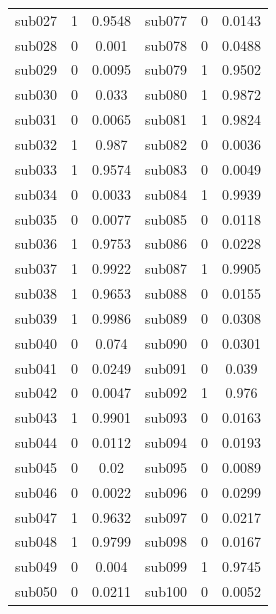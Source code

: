 \documentclass[bwprint]{gmcmthesis}
\begin{document}
\begin{table}[htbp]
\begin{tabular}{cccccc}
    sub027 & 1 & 0.9548 & sub077 & 0 & 0.0143 \\
    sub028 & 0 & 0.001 & sub078 & 0 & 0.0488 \\
    sub029 & 0 & 0.0095 & sub079 & 1 & 0.9502 \\
    sub030 & 0 & 0.033 & sub080 & 1 & 0.9872 \\
    sub031 & 0 & 0.0065 & sub081 & 1 & 0.9824 \\
    sub032 & 1 & 0.987 & sub082 & 0 & 0.0036 \\
    sub033 & 1 & 0.9574 & sub083 & 0 & 0.0049 \\
    sub034 & 0 & 0.0033 & sub084 & 1 & 0.9939 \\
    sub035 & 0 & 0.0077 & sub085 & 0 & 0.0118 \\
    sub036 & 1 & 0.9753 & sub086 & 0 & 0.0228 \\
    sub037 & 1 & 0.9922 & sub087 & 1 & 0.9905 \\
    sub038 & 1 & 0.9653 & sub088 & 0 & 0.0155 \\
    sub039 & 1 & 0.9986 & sub089 & 0 & 0.0308 \\
    sub040 & 0 & 0.074 & sub090 & 0 & 0.0301 \\
    sub041 & 0 & 0.0249 & sub091 & 0 & 0.039 \\
    sub042 & 0 & 0.0047 & sub092 & 1 & 0.976 \\
    sub043 & 1 & 0.9901 & sub093 & 0 & 0.0163 \\
    sub044 & 0 & 0.0112 & sub094 & 0 & 0.0193 \\
    sub045 & 0 & 0.02 & sub095 & 0 & 0.0089 \\
    sub046 & 0 & 0.0022 & sub096 & 0 & 0.0299 \\
    sub047 & 1 & 0.9632 & sub097 & 0 & 0.0217 \\
    sub048 & 1 & 0.9799 & sub098 & 0 & 0.0167 \\
    sub049 & 0 & 0.004 & sub099 & 1 & 0.9745 \\
    sub050 & 0 & 0.0211 & sub100 & 0 & 0.0052 \\
    \bottomrule
  \end{tabular}
\end{table}
\end{document}
